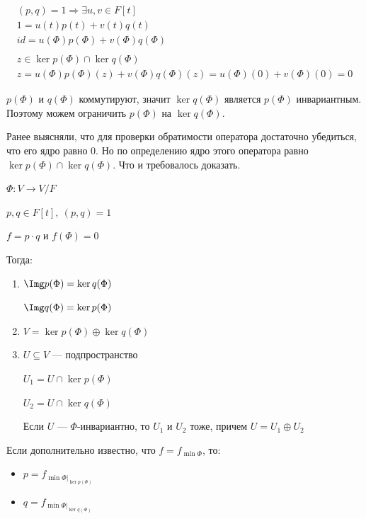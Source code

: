 \begin{gather*}
    (p, q) = 1 \Rightarrow \exists u, v \in F[t]
    \\
    1 = u(t) p(t) + v(t) q(t)
    \\
    id = u(\Phi) p(\Phi) + v(\Phi) q(\Phi)
    \\
    \\
    z \in \ker p(\Phi) \cap \ker q(\Phi)
    \\
    z = u(\Phi) p(\Phi) (z) + v(\Phi) q(\Phi) (z) = u(\Phi) (0) + v(\Phi) (0) = 0
\end{gather*}

\( p(\Phi) \) и \( q(\Phi) \) коммутируют,
значит \( \ker q(\Phi) \) является \( p(\Phi) \) инвариантным.
Поэтому можем ограничить \( p(\Phi) \) на \( \ker q(\Phi) \).

Ранее выясняли, что для проверки обратимости оператора достаточно убедиться,
что его ядро равно \( 0 \).
Но по определению ядро этого оператора равно \( \ker p(\Phi) \cap \ker q(\Phi) \).
Что и требовалось доказать.

\begin{lemma}{}{}
    \( \Phi : V \to V / F \)

    \( p, q \in F[t], \: (p, q) = 1 \)

    \( f = p \cdot q \) и \( f(\Phi) = 0 \)

    Тогда:
    \begin{enumerate}
        \item
            \( \Img p(\Phi) = \ker q(\Phi) \)

            \( \Img q(\Phi) = \ker p(\Phi) \)
        \item
            \( V = \ker p(\Phi) \oplus \ker q(\Phi) \)
        \item
            \( U \subseteq V \) --- подпространство

            \( U_1 = U \cap \ker p(\Phi) \)

            \( U_2 = U \cap \ker q(\Phi) \)

            Если \( U \) --- \( \Phi \)-инвариантно,
            то \( U_1 \) и \( U_2 \) тоже, причем \( U = U_1 \oplus U_2 \)
    \end{enumerate}

    Если дополнительно известно, что \( f = f_{\min \Phi} \),
    то:
    \begin{itemize}
        \item
            \( p = f_{\min \Phi |_{\ker p(\Phi)}} \)
        \item
            \( q = f_{\min \Phi |_{\ker q(\Phi)}} \)
    \end{itemize}
\end{lemma}

